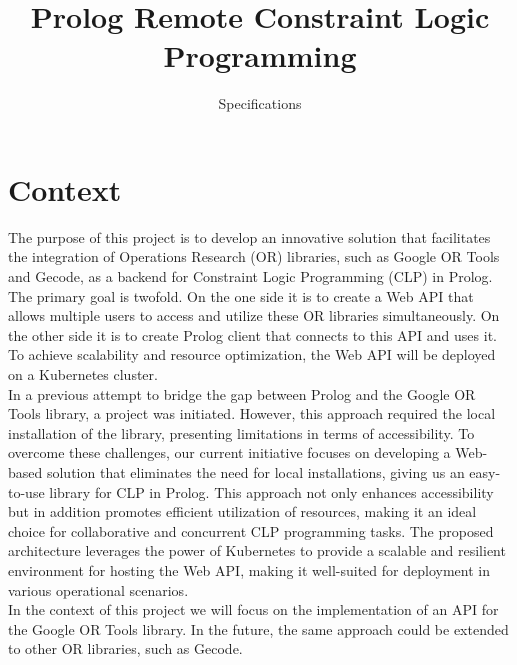 \documentclass[en]{customTemplate}
\title{Prolog Remote Constraint Logic Programming}
\subtitle{Specifications}
\begin{document}
\maketitlepage{}
\makerevisiontable{}

%

\maketableofcontent{}

\fullheader


\section{Context}

The purpose of this project is to develop an innovative solution that facilitates the integration of Operations Research (OR) libraries, such as Google OR Tools and Gecode, as a backend for Constraint Logic Programming (CLP) in Prolog. The primary goal is twofold. On the one side it is to create a Web API that allows multiple users to access and utilize these OR libraries simultaneously. On the other side it is to create Prolog client that connects to this API and uses it. To achieve scalability and resource optimization, the Web API will be deployed on a Kubernetes cluster.\\

In a previous attempt to bridge the gap between Prolog and the Google OR Tools library, a project was initiated. However, this approach required the local installation of the library, presenting limitations in terms of accessibility. To overcome these challenges, our current initiative focuses on developing a Web-based solution that eliminates the need for local installations, giving us an easy-to-use library for CLP in Prolog. This approach not only enhances accessibility but in addition promotes efficient utilization of resources, making it an ideal choice for collaborative and concurrent CLP programming tasks. The proposed architecture leverages the power of Kubernetes to provide a scalable and resilient environment for hosting the Web API, making it well-suited for deployment in various operational scenarios.\\

In the context of this project we will focus on the implementation of an API for the Google OR Tools library. In the future, the same approach could be extended to other OR libraries, such as Gecode.
\end{document}
